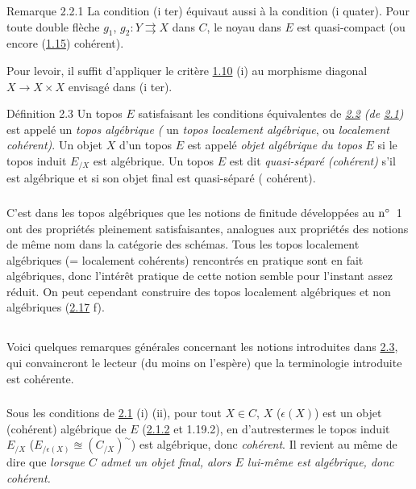 \documentclass[10pt]{../fichiers-configuration-latex/smfart}
\begin{document}
\begin{enonce*}[remark]{Remarque 2.2.1}
La condition (i ter) équivaut aussi à la condition (i quater). Pour
toute double flèche $g_1$, $g_2 : Y \rightrightarrows X$  dans $C$, le
noyau dans $E$ est quasi-compact (ou encore (\hyperref[VI.cor1.15]{1.15}) cohérent).
\end{enonce*}

Pour le\pageoriginale voir, il suffit d'appliquer le critère \hyperref[VI.prop1.10]{1.10} (i)
au morphisme diagonal $X \to X \times X$ envisagé dans (i ter).

\begin{enonce*}{Définition 2.3}
Un topos $E$ satisfaisant les conditions équivalentes de \emph{\hyperref[VI.prop2.2]{2.2} (\resp de
\hyperref[VI.prop2.1]{2.1})} est appelé un \emph{topos algébrique (\resp} un \emph{topos localement
algébrique}, ou \emph{localement cohérent)}. Un objet $X$ d'un topos $E$ est
appelé \emph{objet algébrique du topos} $E$ si le topos induit $E_{/X}$ est
algébrique. Un topos $E$ est dit \emph{quasi-séparé (\resp cohérent)} s'il
est algébrique et si son objet final est quasi-séparé (\resp
cohérent).
\end{enonce*}

\setcounter{subsection}{3}
\subsubsection{}
C'est dans les topos algébriques que les notions de finitude
développées au ${\rm n^{\circ}}$~1 ont des propriétés pleinement
satisfaisantes, analogues aux propriétés des notions de même nom dans
la catégorie des schémas. Tous les topos localement algébriques (=
localement cohérents) rencontrés en pratique sont en fait algébriques,
donc l'intérêt pratique de cette notion semble pour l'instant assez
réduit. On peut cependant construire des topos localement algébriques
et non algébriques (\hyperref[VI.exer2.17]{2.17} f).

\subsection{}
Voici quelques remarques générales concernant les notions introduites
dans \hyperref[VI.def2.3]{2.3}, qui convaincront le lecteur (du moins on
l'espère) que la terminologie introduite est cohérente.

\subsubsection{}
Sous les conditions de \hyperref[VI.prop2.1]{2.1} (i) \resp (ii), pour tout $X \in C$, $X$
(\resp $\epsilon(X)$) est un objet (cohérent) algébrique de $E$
(\hyperref[VI.cor2.1.2]{2.1.2} et 1.19.2),
en d'autres\pageoriginale termes le topos induit
$E_{/X}$ (\resp $E_{/\epsilon(X)} \approxeq (C_{/X})^{\sim}$) est
algébrique, donc
\emph{cohérent}. Il revient au même de dire que \emph{lorsque
$C$ admet un objet
final, alors $E$ lui-même est algébrique, donc cohérent.}
\end{document}
